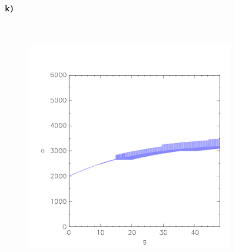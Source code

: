 \paragraph{k)}\mbox{} \\

	\begin{figure}[H]
	\centering
	\includegraphics[width=0.8\textwidth]{Aufgabe_k).png}
\end{figure}